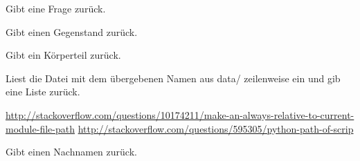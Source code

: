 \documentclass[a4paper,12pt,oneside]{sphinxmanual}
\begin{document}

\begin{fulllineitems}
\label{funktionen:pyzufall.frage}
Gibt eine Frage zurück.

\end{fulllineitems}


\begin{fulllineitems}
\label{funktionen:pyzufall.gegenstand}
Gibt einen Gegenstand zurück.

\end{fulllineitems}


\begin{fulllineitems}
\label{funktionen:pyzufall.koerperteil}
Gibt ein Körperteil zurück.

\end{fulllineitems}


\begin{fulllineitems}
\label{funktionen:pyzufall.lese}
Liest die Datei mit dem übergebenen Namen aus data/ zeilenweise ein und gib eine Liste zurück.

\href{http://stackoverflow.com/questions/10174211/make-an-always-relative-to-current-module-file-path}{http://stackoverflow.com/questions/10174211/make-an-always-relative-to-current-module-file-path}
\href{http://stackoverflow.com/questions/595305/python-path-of-scrip}{http://stackoverflow.com/questions/595305/python-path-of-scrip}

\end{fulllineitems}


\begin{fulllineitems}
\label{funktionen:pyzufall.nachname}
Gibt einen Nachnamen zurück.

\end{fulllineitems}

\end{document}
